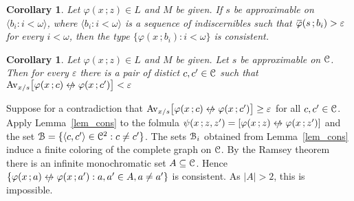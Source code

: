 \documentclass[10pt,openany]{article}
\newcommand{\sbar}[1]{\mkern 1.8mu\overline{\mkern-1.8mu#1\mkern-1mu}\mkern 1mu}
\def\niff{\mathrel{{\leftrightarrow}\llap{\raisebox{-.1ex}{{\small$/$}}\hskip.5ex}}}
\def\C{\EuScript C}
\def\U{\EuScript U}
\def\B{\EuScript B}
\def\<{\langle}
\def\>{\rangle}
\def\phi{\varphi}
\def\epsilon{\varepsilon}
\newcounter{thm}[section]
\theoremstyle{mio}
\newtheorem{corollary}[thm]{Corollary}
\newtheorem{definition}[thm]{Definition}
\theoremstyle{liscio}
\def\QED{\noindent\nolinebreak[4]\hspace{\stretch{1}}\rlap{\ \ $\Box$}\medskip}
\renewenvironment{proof}[1][Proof]%
{\begin{trivlist}\item[\hskip\labelsep {\bf #1}]}
{\QED\end{trivlist}}
\renewcommand*{\emph}[1]{%
   \kern-0.2ex 
   \smash{\tikz[baseline]
   \node[ rectangle, fill=emphcolor, rounded corners, 
          inner xsep=.3ex, inner ysep=.2ex, anchor=base,
          minimum height = 3ex
         ]{#1};
   }
   \kern-1.2ex 
}
\begin{document}
\begin{corollary}
  Let $\phi(x\,;z)\in L$ and $M$ be given.
  If $s$ be approximable on $\<b_i:i<\omega\>$, where $\<b_i:i<\omega\>$ is a sequence of indiscernibles such that $\sbar\phi(s\,;b_i)>\epsilon$ for every $i<\omega$, then the type $\{\phi(x\,;b_i):i<\omega\}$ is consistent.\QED
\end{corollary}

\begin{corollary}
  Let $\phi(x\,;z)\in L$ and $M$ be given.
  Let $s$ be approximable on $\C$.
  Then for every $\epsilon$ there is a pair of distict $c,c'\in\C$ such that $\Av_{x/s}\big[\phi(x\,;c)\niff\phi(x\,;c')\big]<\epsilon$
\end{corollary}

\begin{proof}
  Suppose for a contradiction that $\Av_{x/s}\big[\phi(x\,;c)\niff\phi(x\,;c')\big]\ge\epsilon$ for all $c,c'\in\C$. Apply Lemma~\ref{lem_cons} to the folmula $\psi(x\,;z,z') = [\phi(x\,;z)\niff\phi(x\,;z')]$ and the set $\B=\{\<c,c'\>\in\C^2:c\neq c'\}$.
 The sets $\B_i$ obtained from Lemma~\ref{lem_cons} induce a finite coloring of the complete graph on $\C$.
 By the Ramsey theorem there is an infinite monochromatic set $A\subseteq\C$.
 Hence $\{\phi(x\,;a)\niff\phi(x\,;a') : a,a'\in A, a\neq a'\}$ is consistent.
 As $|A|>2$, this is impossible.
\end{proof}




  



\end{document}

